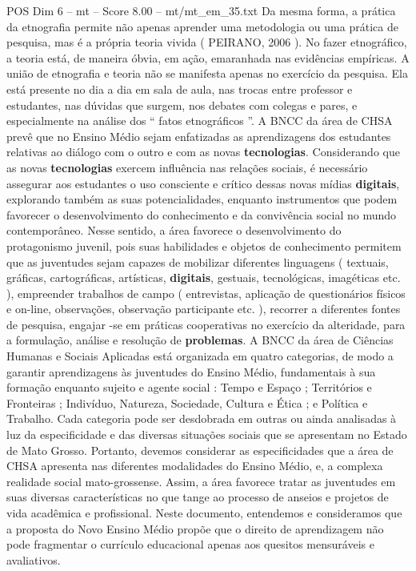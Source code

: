 \begin{textsample}{POS Dim 6 – mt – Score 8.00 – mt/mt\_em\_35.txt}
Da mesma forma, a prática da etnografia permite não apenas aprender uma metodologia ou uma prática de pesquisa, mas é a própria teoria vivida ( PEIRANO, 2006 ).
No fazer etnográfico, a teoria está, de maneira óbvia, em ação, emaranhada nas evidências empíricas.
A união de etnografia e teoria não se manifesta apenas no exercício da pesquisa.
Ela está presente no dia a dia em sala de aula, nas trocas entre professor e estudantes, nas dúvidas que surgem, nos debates com colegas e pares, e especialmente na análise dos “ fatos etnográficos ”.
A BNCC da área de CHSA prevê que no Ensino Médio sejam enfatizadas as aprendizagens dos estudantes relativas ao diálogo com o outro e com as novas \textbf{tecnologias}.
Considerando que as novas \textbf{tecnologias} exercem influência nas relações sociais, é necessário assegurar aos estudantes o uso consciente e crítico dessas novas mídias \textbf{digitais}, explorando também as suas potencialidades, enquanto instrumentos que podem favorecer o desenvolvimento do conhecimento e da convivência social no mundo contemporâneo.
Nesse sentido, a área favorece o desenvolvimento do protagonismo juvenil, pois suas habilidades e objetos de conhecimento permitem que as juventudes sejam capazes de mobilizar diferentes linguagens ( textuais, gráficas, cartográficas, artísticas, \textbf{digitais}, gestuais, tecnológicas, imagéticas etc. ), empreender trabalhos de campo ( entrevistas, aplicação de questionários físicos e on-line, observações, observação participante etc. ), recorrer a diferentes fontes de pesquisa, engajar -se em práticas cooperativas no exercício da alteridade, para a formulação, análise e resolução de \textbf{problemas}.
A BNCC da área de Ciências Humanas e Sociais Aplicadas está organizada em quatro categorias, de modo a garantir aprendizagens às juventudes do Ensino Médio, fundamentais à sua formação enquanto sujeito e agente social : Tempo e Espaço ; Territórios e Fronteiras ; Indivíduo, Natureza, Sociedade, Cultura e Ética ; e Política e Trabalho.
Cada categoria pode ser desdobrada em outras ou ainda analisadas à luz da especificidade e das diversas situações sociais que se apresentam no Estado de Mato Grosso.
Portanto, devemos considerar as especificidades que a área de CHSA apresenta nas diferentes modalidades do Ensino Médio, e, a complexa realidade social mato-grossense.
Assim, a área favorece tratar as juventudes em suas diversas características no que tange ao processo de anseios e projetos de vida acadêmica e profissional.
Neste documento, entendemos e consideramos que a proposta do Novo Ensino Médio propõe que o direito de aprendizagem não pode fragmentar o currículo educacional apenas aos quesitos mensuráveis e avaliativos.

\end{textsample}
